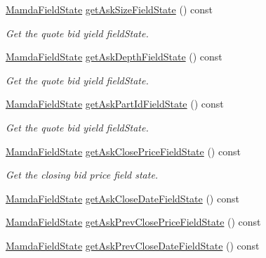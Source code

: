 \begin{CompactItemize}
\hyperlink{namespaceWombat_93aac974f2ab713554fd12a1fa3b7d2a}{Mamda\-Field\-State} \hyperlink{classWombat_1_1MamdaQuoteListener_4e3d063324f15dacfaf2eec0f7f31e71}{get\-Ask\-Size\-Field\-State} () const 
\begin{CompactList}\small\item\em Get the quote bid yield field\-State. \item\end{CompactList}\item 
\hyperlink{namespaceWombat_93aac974f2ab713554fd12a1fa3b7d2a}{Mamda\-Field\-State} \hyperlink{classWombat_1_1MamdaQuoteListener_f43a394a5e090162a80b749f682ecc38}{get\-Ask\-Depth\-Field\-State} () const 
\begin{CompactList}\small\item\em Get the quote bid yield field\-State. \item\end{CompactList}\item 
\hyperlink{namespaceWombat_93aac974f2ab713554fd12a1fa3b7d2a}{Mamda\-Field\-State} \hyperlink{classWombat_1_1MamdaQuoteListener_9208a03480064d6bd80ed3b95136c752}{get\-Ask\-Part\-Id\-Field\-State} () const 
\begin{CompactList}\small\item\em Get the quote bid yield field\-State. \item\end{CompactList}\item 
\hyperlink{namespaceWombat_93aac974f2ab713554fd12a1fa3b7d2a}{Mamda\-Field\-State} \hyperlink{classWombat_1_1MamdaQuoteListener_a6dcf6a065420d6fdf9d5e07093ed603}{get\-Ask\-Close\-Price\-Field\-State} () const 
\begin{CompactList}\small\item\em Get the closing bid price field state. \item\end{CompactList}\item 
\hyperlink{namespaceWombat_93aac974f2ab713554fd12a1fa3b7d2a}{Mamda\-Field\-State} \hyperlink{classWombat_1_1MamdaQuoteListener_b9c4ee5e4eda57e1d1c127adc37e544e}{get\-Ask\-Close\-Date\-Field\-State} () const 
\item 
\hyperlink{namespaceWombat_93aac974f2ab713554fd12a1fa3b7d2a}{Mamda\-Field\-State} \hyperlink{classWombat_1_1MamdaQuoteListener_c49f1d6608af00cc869839845491cd23}{get\-Ask\-Prev\-Close\-Price\-Field\-State} () const 
\item 
\hyperlink{namespaceWombat_93aac974f2ab713554fd12a1fa3b7d2a}{Mamda\-Field\-State} \hyperlink{classWombat_1_1MamdaQuoteListener_2c70b33f8a62de075ddc02e953ee199b}{get\-Ask\-Prev\-Close\-Date\-Field\-State} () const 

\end{CompactItemize}
